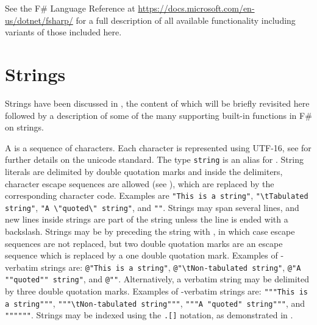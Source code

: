 See the F\# Language Reference at \url{https://docs.microsoft.com/en-us/dotnet/fsharp/} for a full description of all available functionality including variants of those included here.

\section{Strings}
\label{sec:strings}
Strings have been discussed in , the content of which will be briefly revisited here followed by a description of some of the many supporting built-in functions in F\# on strings.

A  is a sequence of characters. Each character is represented using UTF-16, see  for further details on the unicode standard. The type \lstinline{string} is an alias for . String literals are delimited by double quotation marks  and inside the delimiters, character escape sequences are allowed (see ), which are replaced by the corresponding character code. Examples are \lstinline{"This is a string"}, \lstinline{"\tTabulated string"}, \lstinline{"A \"quoted\" string"}, and \lstinline{""}. Strings may span several lines, and new lines inside strings are part of the string unless the line is ended with a backslash. Strings may be  by preceding the string with , in which case escape sequences are not replaced, but two double quotation marks are an escape sequence which is replaced by a one double quotation mark. Examples of -verbatim strings are: \lstinline{@"This is a string"}, \lstinline{@"\tNon-tabulated string"}, \lstinline{@"A ""quoted"" string"}, and \lstinline{@""}. Alternatively, a verbatim string may be delimited by three double quotation marks. Examples of -verbatim strings are: \lstinline{"""This is a string"""}, \lstinline{"""\tNon-tabulated string"""}, \lstinline{"""A "quoted" string"""}, and \lstinline{""""""}. Strings may be indexed using the \lstinline{.[]} notation, as demonstrated in .

